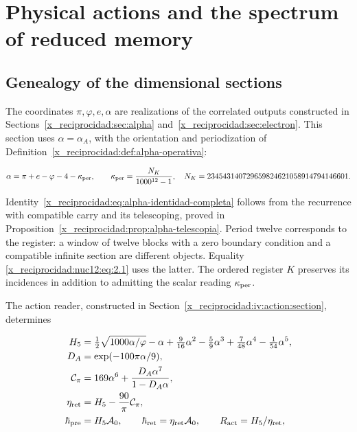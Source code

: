 \chapter{Physical actions and the spectrum of reduced memory}
\label{x_reciprocidad:nuclear:12}
\section{Genealogy of the dimensional sections}

The coordinates \(\pi,\varphi,e,\alpha\) are realizations of the correlated outputs constructed in Sections~\ref{x_reciprocidad:sec:alpha} and~\ref{x_reciprocidad:sec:electron}. This section uses \(\alpha=\alpha_A\), with the orientation and periodization of Definition~\ref{x_reciprocidad:def:alpha-operativa}:



\begin{equation}
\alpha=\pi+e-\varphi-4-\kappa_{\rm per},\qquad
\kappa_{\rm per}=\frac{N_K}{1000^{12}-1},
\quad N_K=234543140729659824621058914794146601.
\label{x_reciprocidad:nuc12:eq:2.1}
\end{equation}



Identity~\eqref{x_reciprocidad:eq:alpha-identidad-completa} follows from the recurrence with compatible carry and its telescoping, proved in Proposition~\ref{x_reciprocidad:prop:alpha-telescopia}. Period twelve corresponds to the register: a window of twelve blocks with a zero boundary condition and a compatible infinite section are different objects. Equality \eqref{x_reciprocidad:nuc12:eq:2.1} uses the latter. The ordered register \(K\) preserves its incidences in addition to admitting the scalar reading \(\kappa_{\rm per}\).

The action reader, constructed in Section~\ref{x_reciprocidad:iv:action:section}, determines



\begin{equation}
\begin{aligned}
H_5&=\tfrac12\sqrt{1000\alpha/\varphi}-\alpha+
\tfrac9{16}\alpha^2-\tfrac59\alpha^3+
\tfrac7{48}\alpha^4-\tfrac1{54}\alpha^5,\\
D_A&=\exp(-100\pi\alpha/9),\\
\mathcal C_\pi&=169\alpha^6+\frac{D_A\alpha^7}{1-D_A\alpha},\\
\eta_{\rm ret}&=H_5-\frac{90}{\pi}\mathcal C_\pi,\\
\hbar_{\rm pre}&=H_5\mathcal A_0,\qquad
\hbar_{\rm ret}=\eta_{\rm ret}\mathcal A_0,\qquad
R_{\rm act}=H_5/\eta_{\rm ret},
\end{aligned}
\label{x_reciprocidad:nuc12:eq:2.2}
\end{equation}




